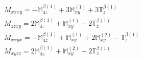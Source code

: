 \documentclass[fleqn,8pt,landscape]{jsarticle}
\begin{document}
\begin{align*}
& M_{xxxy} = - \mathbb{M}_{4z}^{\beta(1)} + 3 \mathbb{M}_{xy}^{(1)} + 3 \mathbb{T}_{z}^{\beta(1)} \\
& M_{zzxy} = 2 \mathbb{M}_{4z}^{\beta(1)} + \mathbb{M}_{xy}^{(1)} - 2 \mathbb{T}_{z}^{\beta(1)} \\
& M_{xxyx} = - \mathbb{M}_{4z}^{\beta(1)} + \mathbb{M}_{xy}^{(1)} + 2 \mathbb{M}_{xy}^{(2)} - \mathbb{T}_{z}^{\beta(1)} \\
& M_{xyzz} = 2 \mathbb{M}_{4z}^{\beta(1)} + \mathbb{M}_{xy}^{(2)} + 2 \mathbb{T}_{z}^{\beta(1)}
\end{align*}
\end{document}
